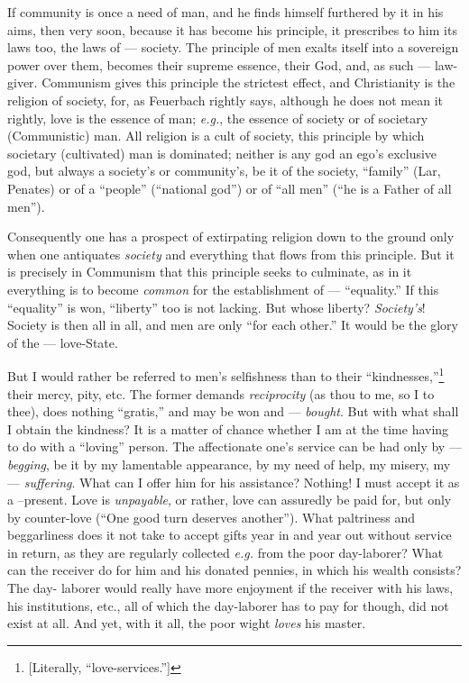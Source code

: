 If community is once a need of man, and he finds himself furthered by it in 
his aims, then very soon, because it has become his principle, it prescribes 
to him its laws too, the laws of --- society. The principle of men exalts 
itself into a sovereign power over them, becomes their supreme essence, their 
God, and, as such --- law-giver. Communism gives this principle the strictest 
effect, and Christianity is the religion of society, for, as Feuerbach rightly 
says, although he does not mean it rightly, love is the essence of man; 
\textit{e.g.}, the essence of society or of societary (Communistic) man. All 
religion is a cult of society, this principle by which societary (cultivated) 
man is dominated; neither is any god an ego's exclusive god, but always a 
society's or community's, be it of the society, ``family'' (Lar, Penates) or 
of a ``people'' (``national god'') or of ``all men'' (``he is a Father 
of all men'').

Consequently one has a prospect of extirpating religion down to the ground 
only when one antiquates \textit{society} and everything that flows from this 
principle. But it is precisely in Communism that this principle seeks to 
culminate, as in it everything is to become \textit{common} for the 
establishment of --- ``equality.'' If this ``equality'' is won, 
``liberty'' too is not lacking. But whose liberty? \textit{Society's}! 
Society is then all in all, and men are only ``for each other.'' It would be 
the glory of the --- love-State.

But I would rather be referred to men's selfishness than to their 
``kindnesses,''\footnote{[Literally, ``love-services.'']} their mercy, 
pity, etc. The former demands \textit{reciprocity} (as thou to me, so I to 
thee), does nothing ``gratis,'' and may be won and --- \textit{bought}. But 
with what shall I obtain the kindness? It is a matter of chance whether I am 
at the time having to do with a ``loving'' person. The affectionate one's 
service can be had only by --- \textit{begging}, be it by my lamentable 
appearance, by my need of help, my misery, my --- \textit{suffering}. What can 
I offer him for his assistance? Nothing! I must accept it as a --present. Love 
is \textit{unpayable}, or rather, love can assuredly be paid for, but only by 
counter-love (``One good turn deserves another''). What paltriness and 
beggarliness does it not take to accept gifts year in and year out without 
service in return, as they are regularly collected \textit{e.g.} from the 
poor day-laborer? What can the receiver do for him and his donated pennies, in 
which his wealth consists? The day- laborer would really have more enjoyment 
if the receiver with his laws, his institutions, etc., all of which the 
day-laborer has to pay for though, did not exist at all. And yet, with it all, 
the poor wight \textit{loves} his master.

